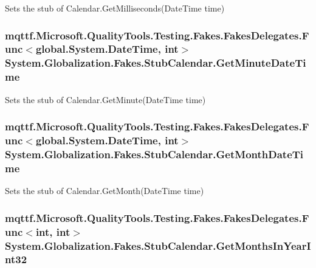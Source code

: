 Sets the stub of Calendar.\-Get\-Milliseconds(\-Date\-Time time)

\hypertarget{class_system_1_1_globalization_1_1_fakes_1_1_stub_calendar_a49420e56f04a6e57b23b7316e440a21a}{
\subsubsection[{Get\-Minute\-Date\-Time}]{\setlength{\rightskip}{0pt plus 5cm}mqttf.\-Microsoft.\-Quality\-Tools.\-Testing.\-Fakes.\-Fakes\-Delegates.\-Func$<$global.\-System.\-Date\-Time, int$>$ System.\-Globalization.\-Fakes.\-Stub\-Calendar.\-Get\-Minute\-Date\-Time}}\label{class_system_1_1_globalization_1_1_fakes_1_1_stub_calendar_a49420e56f04a6e57b23b7316e440a21a}


Sets the stub of Calendar.\-Get\-Minute(\-Date\-Time time)

\hypertarget{class_system_1_1_globalization_1_1_fakes_1_1_stub_calendar_a8775e74835f796fa5a84f36347de796d}{
\subsubsection[{Get\-Month\-Date\-Time}]{\setlength{\rightskip}{0pt plus 5cm}mqttf.\-Microsoft.\-Quality\-Tools.\-Testing.\-Fakes.\-Fakes\-Delegates.\-Func$<$global.\-System.\-Date\-Time, int$>$ System.\-Globalization.\-Fakes.\-Stub\-Calendar.\-Get\-Month\-Date\-Time}}\label{class_system_1_1_globalization_1_1_fakes_1_1_stub_calendar_a8775e74835f796fa5a84f36347de796d}


Sets the stub of Calendar.\-Get\-Month(\-Date\-Time time)

\hypertarget{class_system_1_1_globalization_1_1_fakes_1_1_stub_calendar_a66e55f25dc68ad269e2ca7e091b98267}{
\subsubsection[{Get\-Months\-In\-Year\-Int32}]{\setlength{\rightskip}{0pt plus 5cm}mqttf.\-Microsoft.\-Quality\-Tools.\-Testing.\-Fakes.\-Fakes\-Delegates.\-Func$<$int, int$>$ System.\-Globalization.\-Fakes.\-Stub\-Calendar.\-Get\-Months\-In\-Year\-Int32}}\label{class_system_1_1_globalization_1_1_fakes_1_1_stub_calendar_a66e55f25dc68ad269e2ca7e091b98267}


